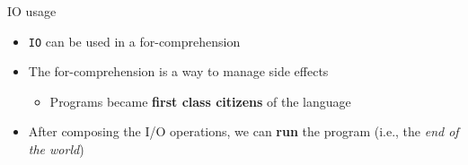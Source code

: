 \documentclass[presentation, 10pt]{beamer}\mode<presentation>{\usetheme{metropolis}}
\begin{document}
\begin{frame}{IO usage}
\begin{itemize}
	\item \texttt{IO} can be used in a for-comprehension
		\item The for-comprehension is a way to manage side effects
		\begin{itemize}
			\item Programs became \textbf{first class citizens} of the language
		\end{itemize}
		\item After composing the I/O operations, we can \textbf{run} the program (i.e., the \emph{end of the world})
\end{itemize}
\inputminted[firstline=42,lastline=48]{scala}{code/src/main/scala/monads/IO.scala}
\end{frame}
\end{document}

